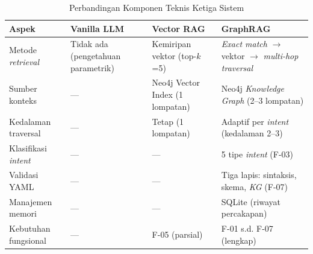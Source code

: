\renewcommand{\arraystretch}{1.3}
\captionsetup[table]{justification=raggedright,singlelinecheck=false}
\begin{table}[H]
\caption{Perbandingan Komponen Teknis Ketiga Sistem}
\label{tbl:perbandingan_sistem}
\centering
\begin{tabular}{|p{}|p{}|p{}|p{}|}
\hline
\textbf{Aspek} & \textbf{Vanilla LLM} & \textbf{Vector RAG} & \textbf{GraphRAG} \\
\hline
Metode \textit{retrieval} &
Tidak ada (pengetahuan parametrik) &
Kemiripan vektor (top-$k$=5) &
\textit{Exact match} $\rightarrow$ vektor $\rightarrow$ \textit{multi-hop traversal} \\
\hline
Sumber konteks &
--- &
Neo4j Vector Index (1 lompatan) &
Neo4j \textit{Knowledge Graph} (2--3 lompatan) \\
\hline
Kedalaman traversal &
--- &
Tetap (1 lompatan) &
Adaptif per \textit{intent} (kedalaman 2--3) \\
\hline
Klasifikasi \textit{intent} &
--- &
--- &
5 tipe \textit{intent} (F-03) \\
\hline
Validasi YAML &
--- &
--- &
Tiga lapis: sintaksis, skema, \textit{KG} (F-07) \\
\hline
Manajemen memori &
--- &
--- &
SQLite (riwayat percakapan) \\
\hline
Kebutuhan fungsional &
--- &
F-05 (parsial) &
F-01 s.d. F-07 (lengkap) \\
\hline
\end{tabular}
\end{table}
